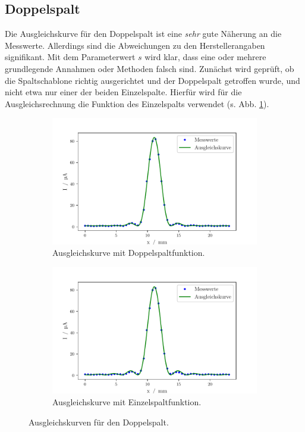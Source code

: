 \subsection{Doppelspalt}
Die Ausgleichskurve für den Doppelspalt ist eine \textit{sehr} gute Näherung an die Messwerte. Allerdings sind die Abweichungen zu den Herstellerangaben signifikant.
Mit dem Parameterwert $s$ wird klar, dass eine oder mehrere grundlegende Annahmen oder Methoden falsch sind. Zunächst wird geprüft, ob die Spaltschablone richtig ausgerichtet und der Doppelspalt getroffen wurde,
und nicht etwa nur einer der beiden Einzelspalte. Hierfür wird für die Ausgleichsrechnung die Funktion des Einzelspalts verwendet (s. Abb. \ref{fig:doppeleinzel}).

\begin{figure}
    \centering
    \begin{subfigure}{.5\textwidth}
      \centering
      \includegraphics[width=.7\textwidth]{python/DoppelspaltFit.pdf}
      \caption{Ausgleichskurve mit Doppelspaltfunktion.}
    \end{subfigure}%
    \begin{subfigure}{.5\textwidth}
        \centering
      \includegraphics[width=.7\linewidth]{python/DoppelspaltFitEinzel.pdf}
      \caption{Ausgleichskurve mit Einzelspaltfunktion.}
    \end{subfigure}
      \caption{Ausgleichskurven für den Doppelspalt.}
      \label{fig:doppeleinzel}
\end{figure}

